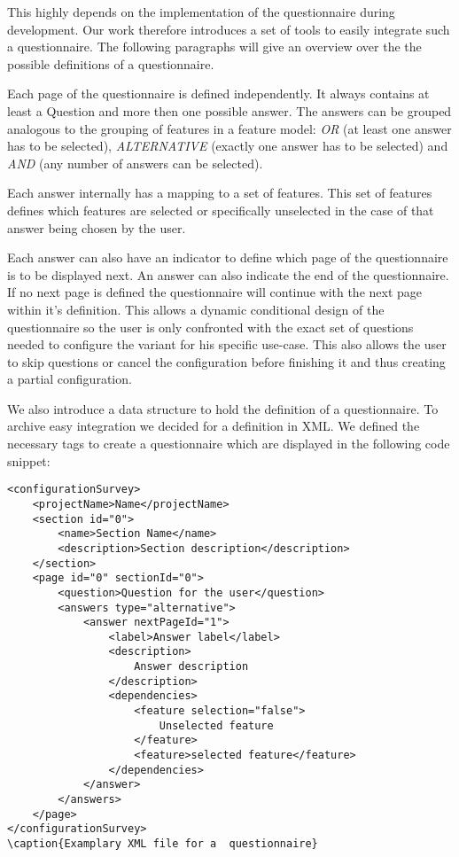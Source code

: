This highly depends on the implementation of the questionnaire during development. Our work therefore introduces a set of tools to easily integrate such a questionnaire. The following paragraphs will give an overview over the the possible definitions of a questionnaire.

Each page of the questionnaire is defined independently. It always contains at least a Question and more then one possible answer. The answers can be grouped analogous to the grouping of features in a feature model: \textit{OR} (at least one answer has to be selected), \textit{ALTERNATIVE} (exactly one answer has to be selected) and \textit{AND} (any number of answers can be selected).

Each answer internally has a mapping to a set of features. This set of features defines which features are selected or specifically unselected in the case of that answer being chosen by the user.

Each answer can also have an indicator to define which page of the questionnaire is to be displayed next. An answer can also indicate the end of the questionnaire. If no next page is defined the questionnaire will continue with the next page within it's definition. This allows a dynamic conditional design of the questionnaire so the user is only confronted with the exact set of questions needed to configure the variant for his specific use-case. This also allows the user to skip questions or cancel the configuration before finishing it and thus creating a partial configuration.

We also introduce a data structure to hold the definition of a questionnaire. To archive easy integration we decided for a definition in XML. We defined the necessary tags to create a questionnaire which are displayed in the following code snippet:

\begin{lstlisting}
<configurationSurvey>
	<projectName>Name</projectName>
	<section id="0">
		<name>Section Name</name>
		<description>Section description</description>
	</section>
	<page id="0" sectionId="0">
		<question>Question for the user</question>
		<answers type="alternative">
			<answer nextPageId="1">
				<label>Answer label</label>
				<description>
					Answer description
				</description>
				<dependencies>
					<feature selection="false">
						Unselected feature
					</feature>
					<feature>selected feature</feature>
				</dependencies>
			</answer>
		</answers>
	</page>
</configurationSurvey>
\caption{Examplary XML file for a  questionnaire}
\end{lstlisting}

